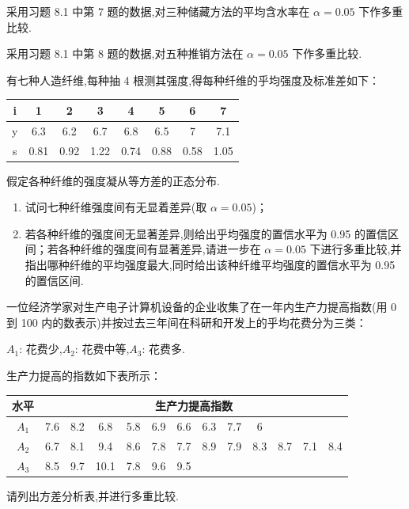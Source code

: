 \begin{xiti}
  \item 采用习题 8.1 中第 7 题的数据,对三种储藏方法的平均含水率在 $\alpha = 0.05$ 下作多重比较.
  \item 采用习题 8.1 中第 8 题的数据,对五种推销方法在 $\alpha = 0.05$ 下作多重比较.
  \item 有七种人造纤维,每种抽 4 根测其强度,得每种纤维的乎均强度及标准差如下：
  \begin{center}
    \begin{tabular}{cccccccc}
      \toprule
      i     & 1     & 2     & 3     & 4     & 5     & 6     & 7 \\
      \midrule
      y     & 6.3   & 6.2   & 6.7   & 6.8   & 6.5   & 7     & 7.1 \\
      s     & 0.81  & 0.92  & 1.22  & 0.74  & 0.88  & 0.58  & 1.05 \\
      \bottomrule
      \end{tabular}%
  \end{center}
  假定各种纤维的强度凝从等方差的正态分布.
  \begin{enumerate}
    \item 试问七种纤维强度间有无显着差异(取 $\alpha=0.05$)；
    \item 若各种纤维的强度间无显著差异,则给出乎均强度的置信水平为 0.95 的置信区间；若各种纤维的强度间有显著差异,请进一步在 $\alpha=0.05$ 下进行多重比较,并指出哪种纤维的平均强度最大,同时给出该种纤维平均强度的置信水平为 0.95 的置信区间.
  \end{enumerate}
  \item 一位经济学家对生产电子计算机设备的企业收集了在一年内生产力提高指数(用 0 到 100 内的数表示)并按过去三年间在科研和开发上的乎均花费分为三类：
  \begin{center}
    $A_1$: 花费少,\quad $A_2$: 花费中等,\quad $A_3$: 花费多.
  \end{center}
生产力提高的指数如下表所示：
\begin{center}
  \begin{tabular}{ccccccccccccc}
    \toprule
    水平    & \multicolumn{12}{c}{生产力提高指数} \\
    \midrule
    $A_1$    & 7.6   & 8.2   & 6.8   & 5.8   & 6.9   & 6.6   & 6.3   & 7.7   & 6     &       &       &  \\
    $A_2$    & 6.7   & 8.1   & 9.4   & 8.6   & 7.8   & 7.7   & 8.9   & 7.9   & 8.3   & 8.7   & 7.1   & 8.4 \\
    $A_3$    & 8.5   & 9.7   & 10.1  & 7.8   & 9.6   & 9.5   &       &       &       &       &       &  \\
    \bottomrule
    \end{tabular}%
\end{center}
请列出方差分析表,并进行多重比较.
\end{xiti}

